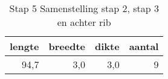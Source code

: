 \begin{table}[h!]
\centering
\caption{Stap 5 Samenstelling stap 2, stap 3 en achter rib}
\begin{tabular}{rrrr}
\toprule
 lengte &  breedte &  dikte &  aantal \\
\midrule
   94,7 &      3,0 &    3,0 &       9 \\
\bottomrule
\end{tabular}
\end{table}
